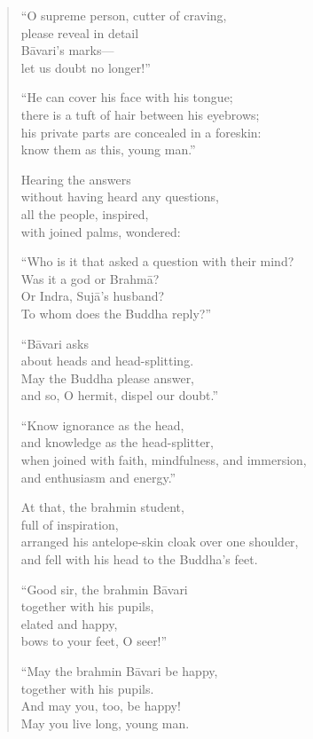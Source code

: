 \documentclass[12pt,openany]{book}%
\begin{document}
\begin{verse}
“O supreme person, cutter of craving, \\
please reveal in detail \\
\textsanskrit{Bāvari}’s marks—\\
let us doubt no longer!” 

“He can cover his face with his tongue; \\
there is a tuft of hair between his eyebrows; \\
his private parts are concealed in a foreskin: \\
know them as this, young man.” 

Hearing the answers \\
without having heard any questions, \\
all the people, inspired, \\
with joined palms, wondered: 

“Who is it that asked a question with their mind? \\
Was it a god or \textsanskrit{Brahmā}? \\
Or Indra, \textsanskrit{Sujā}’s husband? \\
To whom does the Buddha reply?” 

“\textsanskrit{Bāvari} asks \\
about heads and head-splitting. \\
May the Buddha please answer, \\
and so, O hermit, dispel our doubt.” 

“Know ignorance as the head, \\
and knowledge as the head-splitter, \\
when joined with faith, mindfulness, and immersion, \\
and enthusiasm and energy.” 

At that, the brahmin student, \\
full of inspiration, \\
arranged his antelope-skin cloak over one shoulder, \\
and fell with his head to the Buddha’s feet. 

“Good sir, the brahmin \textsanskrit{Bāvari} \\
together with his pupils, \\
elated and happy, \\
bows to your feet, O seer!” 

“May the brahmin \textsanskrit{Bāvari} be happy, \\
together with his pupils. \\
And may you, too, be happy! \\
May you live long, young man. 


\end{verse}
\end{document}
